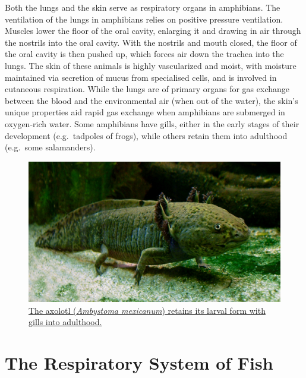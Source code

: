 Both the lungs and the skin serve as respiratory organs in amphibians. The ventilation of the lungs in amphibians relies on positive pressure ventilation. Muscles lower the floor of the oral cavity, enlarging it and drawing in air through the nostrils into the oral cavity. With the nostrils and mouth closed, the floor of the oral cavity is then pushed up, which forces air down the trachea into the lungs. The skin of these animals is highly vascularized and moist, with moisture maintained via secretion of mucus from specialised cells, and is involved in cutaneous respiration. While the lungs are of primary organs for gas exchange between the blood and the environmental air (when out of the water), the skin's unique properties aid rapid gas exchange when amphibians are submerged in oxygen-rich water. Some amphibians have gills, either in the early stages of their development (e.g.~tadpoles of frogs), while others retain them into adulthood (e.g.~some salamanders).



\begin{figure}

{\centering \includegraphics[width=0.7\linewidth]{./figures/respiratory/Axolotl_ganz} 

}

\caption{\href{https://commons.wikimedia.org/wiki/File:Axolotl_ganz.jpg}{The axolotl (\emph{Ambystoma mexicanum}) retains its larval form with gills into adulthood.}}\label{fig:axolotl}
\end{figure}

\hypertarget{the-respiratory-system-of-fish}{%
\section{The Respiratory System of Fish}\label{the-respiratory-system-of-fish}}

